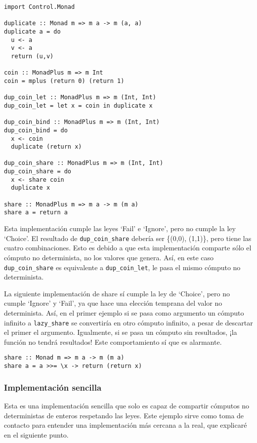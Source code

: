 \documentclass[class=article, crop=false]{standalone}
\begin{document}
\begin{verbatim}  
import Control.Monad

duplicate :: Monad m => m a -> m (a, a)
duplicate a = do
  u <- a
  v <- a
  return (u,v)

coin :: MonadPlus m => m Int
coin = mplus (return 0) (return 1)

dup_coin_let :: MonadPlus m => m (Int, Int)
dup_coin_let = let x = coin in duplicate x

dup_coin_bind :: MonadPlus m => m (Int, Int)
dup_coin_bind = do
  x <- coin
  duplicate (return x)

dup_coin_share :: MonadPlus m => m (Int, Int)
dup_coin_share = do
  x <- share coin
  duplicate x

share :: MonadPlus m => m a -> m (m a)
share a = return a
\end{verbatim}

Esta implementación cumple las leyes `Fail' e `Ignore', pero no cumple la ley `Choice'. El
resultado de \verb`dup_coin_share` debería ser \{(0,0), (1,1)\}, pero tiene las cuatro
combinaciones. Esto es debido a que esta implementación comparte sólo el cómputo no
determinista, no los valores que genera. Así, en este caso \verb`dup_coin_share` es
equivalente a \verb`dup_coin_let`, le pasa el mismo cómputo no determinista.

La siguiente implementación de share sí cumple la ley de `Choice', pero no cumple `Ignore' y
`Fail', ya que hace una elección temprana del valor no determinista. Así, en el primer
ejemplo si se pasa como argumento un cómputo infinito a \verb`lazy_share` se convertiría en
otro cómputo infinito, a pesar de descartar el primer el argumento. Igualmente, si se pasa un
cómputo sin resultados, ¡la función no tendrá resultados! Este comportamiento sí que es
alarmante.

\begin{verbatim} 
share :: Monad m => m a -> m (m a)
share a = a >>= \x -> return (return x)
\end{verbatim}

\subsubsection{Implementación sencilla}
Esta es una implementación sencilla que solo es capaz de compartir cómputos no deterministas
de enteros respetando las leyes. Este ejemplo sirve como toma de contacto para entender una
implementación más cercana a la real, que explicaré en el siguiente punto.
\end{document}
